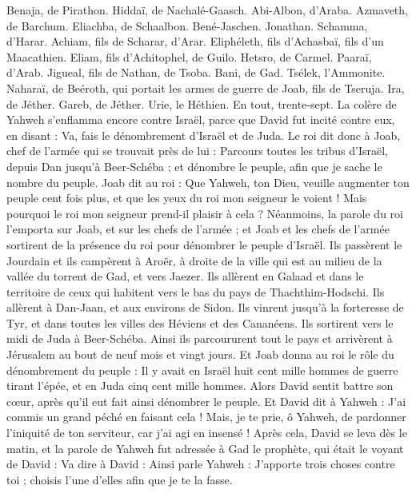 \begin{multicols}{2}
Benaja, de Pirathon. Hiddaï, de Nachalé-Gaasch.
Abi-Albon, d'Araba. Azmaveth, de Barchum.
Eliachba, de Schaalbon. Bené-Jaschen. Jonathan.
Schamma, d'Harar. Achiam, fils de Scharar, d'Arar.
Eliphéleth, fils d'Achasbaï, fils d'un Maacathien. Eliam, fils d'Achitophel, de Guilo.
Hetsro, de Carmel. Paaraï, d'Arab.
Jigueal, fils de Nathan, de Tsoba. Bani, de Gad.
Tsélek, l'Ammonite. Naharaï, de Beéroth, qui portait les armes de guerre de Joab, fils de Tseruja.
Ira, de Jéther. Gareb, de Jéther.
Urie, le Héthien. En tout, trente-sept.
\VerseOne{}La colère de Yahweh s'enflamma encore contre Israël, parce que David fut incité contre eux, en disant : Va, fais le dénombrement d'Israël et de Juda.
Le roi dit donc à Joab, chef de l'armée qui se trouvait près de lui : Parcours toutes les tribus d'Israël, depuis Dan jusqu'à Beer-Schéba ; et dénombre le peuple, afin que je sache le nombre du peuple.
Joab dit au roi : Que Yahweh, ton Dieu, veuille augmenter ton peuple cent fois plus, et que les yeux du roi mon seigneur le voient ! Mais pourquoi le roi mon seigneur prend-il plaisir à cela ?
Néanmoins, la parole du roi l'emporta sur Joab, et sur les chefs de l'armée ; et Joab et les chefs de l'armée sortirent de la présence du roi pour dénombrer le peuple d'Israël.
Ils passèrent le Jourdain et ils campèrent à Aroër, à droite de la ville qui est au milieu de la vallée du torrent de Gad, et vers Jaezer.
Ils allèrent en Galaad et dans le territoire de ceux qui habitent vers le bas du pays de Thachthim-Hodschi. Ils allèrent à Dan-Jaan, et aux environs de Sidon.
Ils vinrent jusqu'à la forteresse de Tyr, et dans toutes les villes des Héviens et des Cananéens. Ils sortirent vers le midi de Juda à Beer-Schéba.
Ainsi ils parcoururent tout le pays et arrivèrent à Jérusalem au bout de neuf mois et vingt jours.
Et Joab donna au roi le rôle du dénombrement du peuple : Il y avait en Israël huit cent mille hommes de guerre tirant l'épée, et en Juda cinq cent mille hommes.
Alors David sentit battre son cœur, après qu'il eut fait ainsi dénombrer le peuple. Et David dit à Yahweh : J'ai commis un grand péché en faisant cela ! Mais, je te prie, ô Yahweh, de pardonner l'iniquité de ton serviteur, car j'ai agi en insensé !
Après cela, David se leva dès le matin, et la parole de Yahweh fut adressée à Gad le prophète, qui était le voyant de David :
Va dire à David : Ainsi parle Yahweh : J'apporte trois choses contre toi ; choisis l'une d'elles afin que je te la fasse.

\end{multicols}
